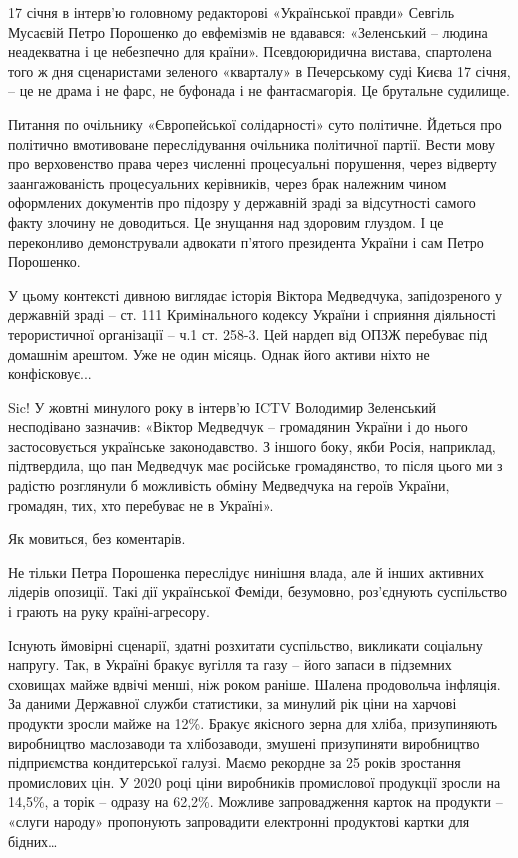 17 січня в інтерв’ю головному редакторові «Української правди» Севгіль Мусаєвій
Петро Порошенко до евфемізмів не вдавався: «Зеленський – людина неадекватна і
це небезпечно для країни». Псевдоюридична вистава, спартолена того ж дня
сценаристами зеленого «кварталу» в Печерському суді Києва 17 січня, – це не
драма і не фарс, не буфонада і не фантасмагорія. Це брутальне судилище.

Питання по очільнику «Європейської солідарності» суто політичне. Йдеться про
політично вмотивоване переслідування очільника політичної партії. Вести мову
про верховенство права через численні процесуальні порушення, через відверту
заангажованість процесуальних керівників, через брак належним чином оформлених
документів про підозру у державній зраді за відсутності самого факту злочину не
доводиться. Це знущання над здоровим глуздом. І це переконливо демонстрували
адвокати п’ятого президента України і сам Петро Порошенко.

У цьому контексті дивною виглядає історія Віктора Медведчука, запідозреного у
державній зраді – ст. 111 Кримінального кодексу України і сприяння діяльності
терористичної організації – ч.1 ст. 258-3. Цей нардеп від ОПЗЖ перебуває під
домашнім арештом. Уже не один місяць. Однак його активи ніхто не конфісковує...

Sic! У жовтні минулого року в інтерв'ю ICTV Володимир Зеленський несподівано
зазначив: «Віктор Медведчук – громадянин України і до нього застосовується
українське законодавство. З іншого боку, якби Росія, наприклад, підтвердила, що
пан Медведчук має російське громадянство, то після цього ми з радістю
розглянули б можливість обміну Медведчука на героїв України, громадян, тих, хто
перебуває не в Україні».


Як мовиться, без коментарів.

Не тільки Петра Порошенка переслідує нинішня влада, але й інших активних
лідерів опозиції. Такі дії української Феміди, безумовно, роз’єднують
суспільство і грають на руку країні-агресору.

Існують ймовірні сценарії, здатні розхитати суспільство, викликати соціальну
напругу. Так, в Україні бракує вугілля та газу – його запаси в підземних
сховищах майже вдвічі менші, ніж роком раніше. Шалена продовольча інфляція. За
даними Державної служби статистики, за минулий рік ціни на харчові продукти
зросли майже на 12\%. Бракує якісного зерна для хліба, призупиняють виробництво
маслозаводи та хлібозаводи, змушені призупиняти виробництво підприємства
кондитерської галузі. Маємо рекордне за 25 років зростання промислових цін. У
2020 році ціни виробників промислової продукції зросли на 14,5\%, а торік –
одразу на 62,2\%. Можливе запровадження карток на продукти – «слуги народу»
пропонують запровадити електронні продуктові картки для бідних…

